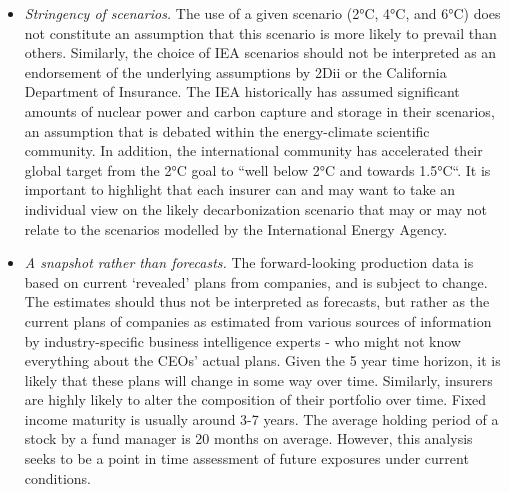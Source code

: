 \documentclass[10pt,table,a4]{article}\usepackage[]{graphicx}\usepackage[]{color}
\begin{document}
	\begin{multicols}{2}
		\begin{itemize}
			\item{\textit{Stringency of scenarios.} The use of a given scenario (2°C, 4°C, and 6°C) does not constitute an assumption that this scenario is more likely to prevail than others. Similarly, the choice of IEA scenarios should not be interpreted as an endorsement of the underlying assumptions by 2Dii or the California Department of Insurance. The IEA historically has assumed significant amounts of nuclear power and carbon capture and storage in their scenarios, an assumption that is debated within the energy-climate scientific community. In addition, the international community has accelerated their global target from the 2°C goal to “well below 2°C and towards 1.5°C“. It is important to highlight that each insurer can and may want to take an individual view on the likely decarbonization scenario that may or may not relate to the scenarios modelled by the International Energy Agency.}
			
			\item{\textit{A snapshot rather than forecasts.} The forward-looking production data is based on current ‘revealed’ plans from companies, and is subject to change. The estimates should thus not be interpreted as forecasts, but rather as the current plans of companies as estimated from various sources of information by industry-specific business intelligence experts - who might not know everything about the CEOs’ actual plans. Given the 5 year time horizon, it is likely that these plans will change in some way over time. Similarly, insurers are highly likely to alter the composition of their portfolio over time. Fixed income maturity is usually around 3-7 years. The average holding period of a stock by a fund manager is 20 months on average. However, this analysis seeks to be a point in time assessment of future exposures under current conditions.}
			

\end{itemize}
\end{multicols}
\end{document}
